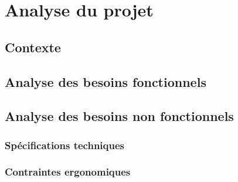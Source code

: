 \chapter{Analyse du projet}
	\section{Contexte}
	
	\section{Analyse des besoins fonctionnels}
	
	\section{Analyse des besoins non fonctionnels}
		\subsection{Spécifications techniques}
		\subsection{Contraintes ergonomiques}